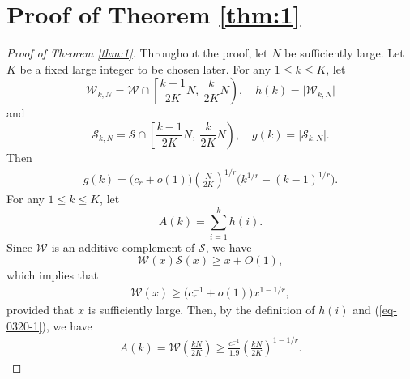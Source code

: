 \documentclass[12pt,a4paper,reqno]{amsart}
\numberwithin{equation}{section}
\theoremstyle{plain}
\theoremstyle{definition}
\begin{document}
\section{Proof of Theorem \ref{thm:1}}
\begin{proof}[Proof of Theorem \ref{thm:1}]
Throughout the proof, let $N$ be sufficiently large.
Let $K$ be a fixed large integer to be chosen later. For any $1\le k\le K$, let
$$
\mathscr{W}_{k,N}=\mathscr{W}\cap \left[\frac{k-1}{2K}N,\ \frac{k}{2K}N\right), \quad h(k)=\big|\mathscr{W}_{k,N}\big|
$$
and
$$
\mathscr{S}_{k,N}=\mathscr{S}\cap \left[\frac{k-1}{2K}N,\ \frac{k}{2K}N\right), \quad g(k)=\big|\mathscr{S}_{k,N}\big|.
$$
Then
\begin{align}\label{eq-1214-2}
g(k)=\Big(c_r+o(1)\Big)\left(\frac{N}{2K}\right)^{1/r}\Big(k^{1/r}-(k-1)^{1/r}\Big).
\end{align}
For any $1\le k\le K$, let
$$
A(k)=\sum_{i=1}^{k}h(i).
$$
Since $\mathscr{W}$ is an additive complement of $\mathscr{S}$, we have
$$
\mathscr{W}(x)\mathscr{S}(x)\ge x+O(1),
$$
which implies that
\begin{align}\label{eq-0320-1}
\mathscr{W}(x)\ge \Big(c_r^{-1}+o(1)\Big)x^{1-1/r},
\end{align}
provided that $x$ is sufficiently large.
Then, by the definition of $h(i)$ and (\ref{eq-0320-1}), we have 
\begin{align}\label{eq-1228-1}
A(k)=\mathscr{W}\left(\frac{kN}{2K}\right)\ge \frac{c_r^{-1}}{1.9}\left(\frac{kN}{2K}\right)^{1-1/r}.
\end{align}



\end{proof}
\end{document}
